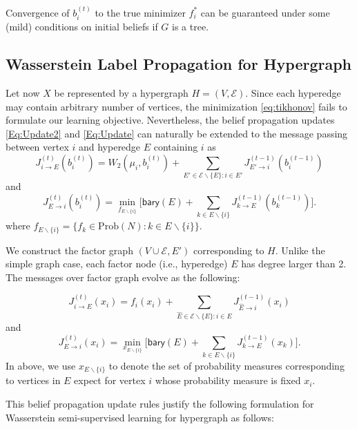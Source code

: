 \documentclass[letterpaper]{article} %
\begin{document}
Convergence of $b_i^{(t)}$ to the true minimizer $f^*_i$ can be guaranteed under some (mild) conditions on initial beliefs if $G$ is a tree. 
\subsection{Wasserstein Label Propagation for Hypergraph}
Let now $X$ be represented by a hypergraph $H=(V, \mathcal E)$. Since each hyperedge may contain arbitrary number of vertices, the minimization \eqref{eq:tikhonov} fails to formulate our learning objective. Nevertheless, the belief propagation updates \eqref{Eq:Update2} and \eqref{Eq:Update} can naturally be extended to the message passing between vertex $i$ and hyperedge $E$ containing $i$ as 
\begin{equation}\label{Eq:Update_H_2}
J^{(t)}_{i\to E} (b_i^{(t)}) = W_2(\mu_i, b_i^{(t)}) + \sum_{E'\in \mathcal E\backslash\{E\}: i\in E'}J^{(t-1)}_{E'\to i}(b_i^{(t-1)})
\end{equation}
and 
\begin{equation}\label{Eq:Update_H}
    J^{(t)}_{E\to i}(b_i^{(t)}) =  \min_{f_{E\backslash \{i\}}}\Big[\mathsf{bary}(E) + \sum_{k\in E\backslash \{i\}}J^{(t-1)}_{k\to E}(b_k^{(t-1)})\Big].
\end{equation}
where $f_{E\backslash \{i\}}=\{f_k\in\mathrm{Prob}(N): k\in E\backslash\{i\}\}$.







We construct the factor graph $(V\cup \mathcal E, E')$ corresponding to $H$. Unlike the simple graph case, each factor node (i.e., hyperedge) $E$ has degree larger than 2. The messages over factor graph evolve as the following:

$$J^{(t)}_{i\to E} (x_i) = f_i(x_i) + \sum_{\hat E\in \mathcal E\backslash\{E\}: i\in \hat E}J^{(t-1)}_{\hat E\to i}(x_i)$$
and 
\begin{equation}\label{Eq:Update}
    J^{(t)}_{E\to i}(x_i) =  \min_{x_{E\backslash \{i\}}}\Big[\mathsf{bary}(E) + \sum_{k\in E\backslash \{i\}}J^{(t-1)}_{k\to E}(x_k)\Big].
\end{equation}
In above, we use $x_{E\backslash \{i\}}$ to denote the set of probability measures corresponding to vertices in $E$ expect for vertex $i$ whose probability measure is fixed $x_i$.

This belief propagation update rules justify the following formulation for Wasserstein semi-supervised learning for hypergraph as follows:
\end{document}
